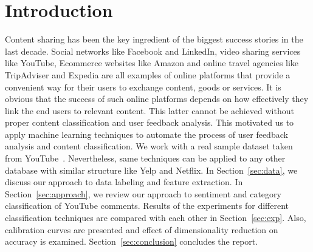 \section{Introduction}
\label{intro}

Content sharing has been the key ingredient of the biggest success stories in the last decade. 
Social networks like Facebook and LinkedIn, video sharing services like YouTube, 
Ecommerce websites like Amazon and online travel agencies like TripAdviser and Expedia are all examples
of online platforms that provide a convenient way for their users to exchange content, goods or services.
It is obvious that the success of such online platforms depends on how effectively they link the end users to relevant content.
This latter cannot be achieved without proper content classification and user feedback analysis.
This motivated us to apply machine learning techniques to automate the process of user feedback analysis and content classification.
We work with a real sample dataset taken from YouTube~\cite{youtubedata}. Nevertheless, same techniques can be applied to any other database with similar structure like Yelp and Netflix.
In Section~\ref{sec:data}, we discuss our approach to data labeling and feature extraction. In Section~\ref{sec:approach}, we review our approach to sentiment and category classification of YouTube comments. Results of the experiments for different classification techniques are compared with each other in Section~\ref{sec:exp}. Also, calibration curves are presented and effect of dimensionality reduction on accuracy is examined. Section~\ref{sec:conclusion} concludes the report.
